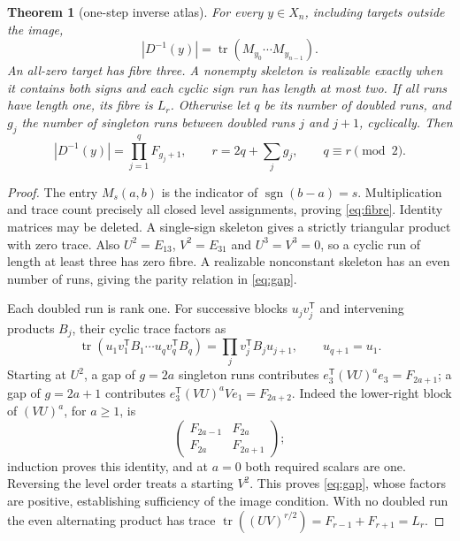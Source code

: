 \documentclass[a4paper,10pt]{amsart}
\newtheorem{theorem}{Theorem}[section]
\theoremstyle{remark}
\newcommand{\sgn}{\operatorname{sgn}}
\newcommand{\tr}{\operatorname{tr}}
\begin{document}
\begin{theorem}[one-step inverse atlas]\label{thm:fibre}
For every $y\in X_n$, including targets outside the image,
\begin{equation}\label{eq:fibre}
|D^{-1}(y)|=\tr(M_{y_0}\cdots M_{y_{n-1}}).
\end{equation}
An all-zero target has fibre three. A nonempty skeleton is realizable
exactly when it contains both signs and each cyclic sign run has length
at most two. If all runs have length one, its fibre is $L_r$. Otherwise
let $q$ be its number of doubled runs, and $g_j$ the number of singleton
runs between doubled runs $j$ and $j+1$, cyclically. Then
\begin{equation}\label{eq:gap}
|D^{-1}(y)|=\prod_{j=1}^q F_{g_j+1},\qquad
r=2q+\sum_jg_j,\qquad q\equiv r\pmod2.
\end{equation}
\end{theorem}
\begin{proof}
The entry $M_s(a,b)$ is the indicator of $\sgn(b-a)=s$. Multiplication
and trace count precisely all closed level assignments, proving
\eqref{eq:fibre}. Identity matrices may be deleted. A single-sign
skeleton gives a strictly triangular product with zero trace. Also
$U^2=E_{13}$, $V^2=E_{31}$ and $U^3=V^3=0$, so a cyclic run of length
at least three has zero fibre. A realizable nonconstant skeleton has an
even number of runs, giving the parity relation in \eqref{eq:gap}.

Each doubled run is rank one. For successive blocks $u_jv_j^{\mathsf T}$
and intervening products $B_j$, their cyclic trace factors as
\begin{equation*}
\tr(u_1v_1^{\mathsf T}B_1\cdots u_qv_q^{\mathsf T}B_q)
=\prod_j v_j^{\mathsf T}B_ju_{j+1},\qquad u_{q+1}=u_1.
\end{equation*}
Starting at $U^2$, a gap of $g=2a$ singleton runs contributes
$e_3^{\mathsf T}(VU)^ae_3=F_{2a+1}$; a gap of $g=2a+1$ contributes
$e_3^{\mathsf T}(VU)^aVe_1=F_{2a+2}$. Indeed the lower-right block
of $(VU)^a$, for $a\ge1$, is
\begin{equation*}
\begin{pmatrix}F_{2a-1}&F_{2a}\\F_{2a}&F_{2a+1}\end{pmatrix};
\end{equation*}
induction proves this identity, and at $a=0$ both required scalars are
one. Reversing the level order treats a starting $V^2$. This proves
\eqref{eq:gap}, whose factors are positive, establishing sufficiency of
the image condition. With no doubled run the even alternating product
has trace $\tr((UV)^{r/2})=F_{r-1}+F_{r+1}=L_r$.
\end{proof}
\end{document}
